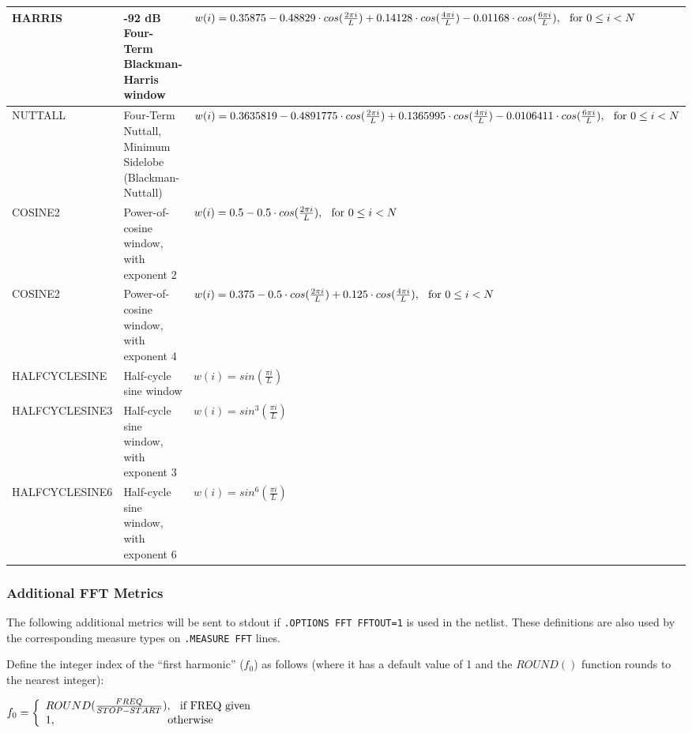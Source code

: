 \begin{longtable}[h] {>{\raggedright\small}m{1.15in}|>{\raggedright\let\\\tabularnewline\small}m{1.35in}
  |>{\raggedright\let\\\tabularnewline\small}m{3.5in}}
  HARRIS & -92 dB Four-Term Blackman-Harris window~\cite{Doerry2017} &
    $w(i) = 0.35875 - 0.48829 \cdot cos(\frac{2 \pi i}{L}) + 0.14128 \cdot cos(\frac{4 \pi i}{L}) - 0.01168 \cdot cos(\frac{6 \pi i}{L}), \hspace*{0.1in}\textrm{for}~0 \leq i < N$  \\ \hline
  NUTTALL & Four-Term Nuttall, Minimum Sidelobe (Blackman-Nuttall)~\cite{Doerry2017} &
    $w(i) = 0.3635819 - 0.4891775 \cdot cos(\frac{2 \pi i}{L}) + 0.1365995 \cdot cos(\frac{4 \pi i}{L}) - 0.0106411 \cdot cos(\frac{6 \pi i}{L}), \hspace*{0.1in}\textrm{for}~0 \leq i < N$  \\ \hline
   COSINE2 & Power-of-cosine window, with exponent 2 &
   $w(i) = 0.5 - 0.5 \cdot cos(\frac{2 \pi i}{L}), \hspace*{0.1in}\textrm{for}~0 \leq i < N $ \\ \hline
   COSINE2 & Power-of-cosine window, with exponent 4 &
   $w(i) = 0.375-0.5 \cdot cos(\frac{2 \pi i}{L})+0.125 \cdot cos(\frac{4 \pi i}{L}), \hspace*{0.1in}\textrm{for}~0 \leq i < N$ \\ \hline
   HALFCYCLESINE & Half-cycle sine window & $w(i) = sin(\frac{\pi i}{L}) $ \\ \hline
   HALFCYCLESINE3 & Half-cycle sine window, with exponent 3 & $w(i) = sin^{3}(\frac{\pi i}{L}) $ \\ \hline
   HALFCYCLESINE6 & Half-cycle sine window, with exponent 6 & $w(i) = sin^{6}(\frac{\pi i}{L}) $ \\ \hline
\end{longtable}

\subsubsection{Additional FFT Metrics}
\label{FFT_metrics}
The following additional metrics will be sent to stdout if \texttt{.OPTIONS FFT FFTOUT=1}
is used in the netlist.  These definitions are also used by the corresponding measure
types on \texttt{.MEASURE FFT} lines.

Define the integer index of the ``first harmonic'' ($f_{0}$) as follows (where it has a
default value of 1 and the $ROUND()$ function rounds to the nearest integer):

$f_{0}=\left\{\begin{array}{ll}ROUND(\frac{FREQ}{STOP-START}),\hspace*{0.1in}\textrm{if FREQ given} \\
 1,\hspace*{1.4in}\textrm{otherwise}\end{array}\right.$

